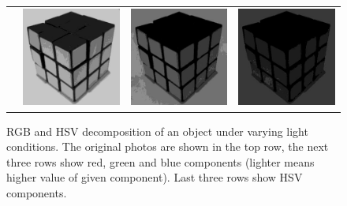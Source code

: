 \begin{figure}
\begin{tabular}{rccc}
         \raisebox{\raiselength}{Value} &
         \includegraphics[width=\rubiklength]{img/rubik/1_hsv_v.jpg} & 
         \includegraphics[width=\rubiklength]{img/rubik/2_hsv_v.jpg} & \includegraphics[width=\rubiklength]{img/rubik/3_hsv_v.jpg}

    \end{tabular}
    \caption[RGB and HSV decomposition of an object under varying light conditions]{RGB and HSV decomposition of an object under varying light conditions. The original photos are shown in the top row, the next three
    rows show red, green and blue components (lighter means higher value
    of given component). Last three rows show HSV components.}
    \label{fig:rubik_rgb_hsv}
\end{figure}

